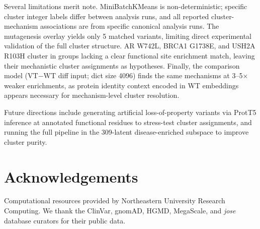 \documentclass[10pt]{article}
\begin{document}
Several limitations merit note. MiniBatchKMeans is non-deterministic; specific cluster integer
labels differ between analysis runs, and all reported cluster-mechanism associations are from
specific canonical analysis runs. The mutagenesis overlay yields only 5 matched variants,
limiting direct experimental validation of the full cluster structure. AR W742L, BRCA1
G1738E, and USH2A R103H cluster in groups lacking a clear functional site enrichment match,
leaving their mechanistic cluster assignments as hypotheses. Finally, the comparison model
(VT$-$WT diff input; dict size 4096) finds the same mechanisms at 3--5$\times$ weaker
enrichments, as protein identity context encoded in WT embeddings appears necessary for
mechanism-level cluster resolution.

Future directions include generating artificial loss-of-property variants via ProtT5
inference at annotated functional residues to stress-test cluster assignments, and running
the full pipeline in the 309-latent disease-enriched subspace to improve cluster purity.

\section*{Acknowledgements}

Computational resources provided by Northeastern University Research Computing. We thank the
ClinVar, gnomAD, HGMD, MegaScale, and \emph{jose} database curators for their public data.



\end{document}
